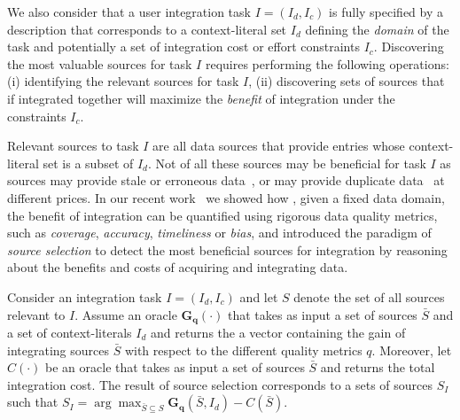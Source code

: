 \documentclass{vldb}
\begin{document}
We also consider that a user integration task $I = (I_d, I_c)$ is fully specified by a description that corresponds to a context-literal set $I_d$ defining the {\em domain} of the task and potentially a set of integration cost or effort constraints $I_c$. Discovering the most valuable sources for task $I$ requires performing the following operations: (i) identifying the relevant sources for task $I$, (ii) discovering sets of sources that if integrated together will maximize the {\em benefit} of integration under the constraints $I_c$. 

Relevant sources to task $I$ are all data sources that provide entries whose context-literal set is a subset of $I_d$. Not of all these sources may be beneficial for task $I$ as sources may provide stale or erroneous data~\cite{Dong_vldb:2009, li:2012}, or may provide duplicate data~\cite{bronzi:2013, li:2012} at different prices. In our recent work~\cite{dong:vldb13,rekatsinas:2014, rekatsinas:2015} we showed how
, given a fixed data domain, the benefit of integration can be quantified using rigorous data quality metrics, such as {\em coverage}, {\em accuracy}, {\em timeliness} or {\em bias}, and introduced the paradigm of {\em source selection} to detect the most beneficial sources for integration by reasoning about the benefits and costs of acquiring and integrating data. 

Consider an integration task $I = (I_d, I_c)$ and let $S$ denote the set of all sources relevant to $I$. Assume an oracle $\mathbf{G_q}(\cdot)$ that takes as input a set of sources $\bar{S}$ and a set of context-literals $I_d$ and returns the a vector containing the gain of integrating sources $\bar{S}$ with respect to the different quality metrics $q$. Moreover, let $C(\cdot)$ be an oracle that takes as input a set of sources $\bar{S}$ and returns the total integration cost. The result of source selection corresponds to a sets of sources $S_I$ such that $S_I = \arg\max_{\bar{S} \subseteq S}\mathbf{G_q}(\bar{S},I_d) - C(\bar{S})$.
\end{document}
